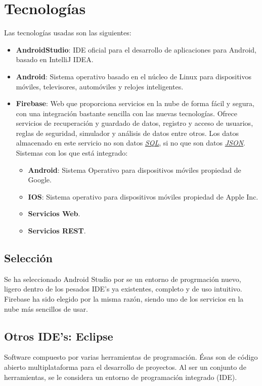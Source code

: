 \section{Tecnologías}
	Las tecnologías usadas son las siguientes:
	\begin{itemize}
		\item {\bf AndroidStudio}\cite{1:androidstudio:online}: IDE oficial para el desarrollo de aplicaciones para Android, basado en IntelliJ IDEA.
		\item {\bf Android}\cite{2:android:online}: Sistema operativo basado en el núcleo de Linux para dispositivos móviles, televisores, automóviles y relojes inteligentes.
		\item {\bf Firebase}\cite{6:firebase:online}: Web que proporciona servicios en la nube de forma fácil y segura, con una integración bastante sencilla con las nuevas tecnologías. Ofrece servicios de recuperación y guardado de datos, registro y acceso de usuarios, reglas de seguridad, simulador y análisis de datos entre otros. Los datos almacenado en este servicio no son datos \href{http://es.wikipedia.org/wiki/SQL}{\textit{SQL}}, si no que son datos \href{http://es.wikipedia.org/wiki/JSON}{\textit{JSON}}\cite{7:json:online}. Sistemas con los que está integrado:
		\begin{itemize}
			\item {\bf Android}\cite{2:android:online}: Sistema Operativo para dispositivos móviles propiedad de Google.
			\item {\bf IOS}: Sistema operativo para dispositivos móviles propiedad de Apple Inc.
			\item {\bf Servicios Web}.
			\item {\bf Servicios REST}.
		\end{itemize}
	\end{itemize}
	
	\subsection{Selección}
	Se ha seleccionado Android Studio por se un entorno de progrmación nuevo, ligero dentro de los pesados IDE's ya existentes, completo y de uso intuitivo. Firebase ha sido elegido por la misma razón, siendo uno de los servicios en la nube más sencillos de usar.
	
	\subsection{Otros IDE's: Eclipse}
	Software compuesto por varias herramientas de programación. Ésas son de código abierto multiplataforma para el desarrollo de proyectos. Al ser un conjunto de herramientas, se le considera un entorno de programación integrado (IDE).
	
